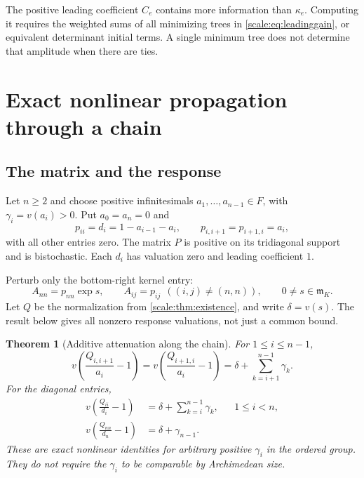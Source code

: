 \documentclass[11pt,a4paper]{article}
\numberwithin{equation}{section}
\newtheorem{theorem}{Theorem}[section]
\theoremstyle{definition}
\newcommand{\mm}{\mathfrak m}
\begin{document}
The positive leading coefficient $C_e$ contains more information
than $\kappa_e$. Computing it requires the weighted sums of all
minimizing trees in \eqref{scale:eq:leadinggain}, or equivalent
determinant initial terms. A single minimum tree does not determine
that amplitude when there are ties.

\section{Exact nonlinear propagation through a chain}
\label{scale:sec:chain}

\subsection{The matrix and the response}
Let $n\geq2$ and choose positive infinitesimals
$a_1,\ldots,a_{n-1}\in F$, with $\gamma_i=v(a_i)>0$.
Put $a_0=a_n=0$ and
\begin{equation}\label{scale:eq:chainmatrix}
 p_{ii}=d_i=1-a_{i-1}-a_i,\qquad
 p_{i,i+1}=p_{i+1,i}=a_i,
\end{equation}
with all other entries zero. The matrix $P$ is positive on its
tridiagonal support and is bistochastic. Each $d_i$ has valuation
zero and leading coefficient $1$.

Perturb only the bottom-right kernel entry:
\[
 A_{nn}=p_{nn}\exp s,\qquad A_{ij}=p_{ij}\ \ ((i,j)\ne(n,n)),
 \qquad 0\ne s\in\mm_K.
\]
Let $Q$ be the normalization from \cref{scale:thm:existence}, and
write $\delta=v(s)$. The result below gives all nonzero response
valuations, not just a common bound.

\begin{theorem}[Additive attenuation along the chain]
\label{scale:thm:chain}
For $1\leq i\leq n-1$,
\begin{equation}\label{scale:eq:chainoffdiag}
 v\!\left(\frac{Q_{i,i+1}}{a_i}-1\right)
 =v\!\left(\frac{Q_{i+1,i}}{a_i}-1\right)
 =\delta+\sum_{k=i+1}^{n-1}\gamma_k.
\end{equation}
For the diagonal entries,
\begin{align}
 v\!\left(\frac{Q_{ii}}{d_i}-1\right)
     &=\delta+\sum_{k=i}^{n-1}\gamma_k,
            &&1\leq i<n,\label{scale:eq:chaindiag}\\
 v\!\left(\frac{Q_{nn}}{d_n}-1\right)
     &=\delta+\gamma_{n-1}.\label{scale:eq:chainlast}
\end{align}
These are exact nonlinear identities for arbitrary positive
$\gamma_i$ in the ordered group. They do not require the
$\gamma_i$ to be comparable by Archimedean size.
\end{theorem}
\end{document}
